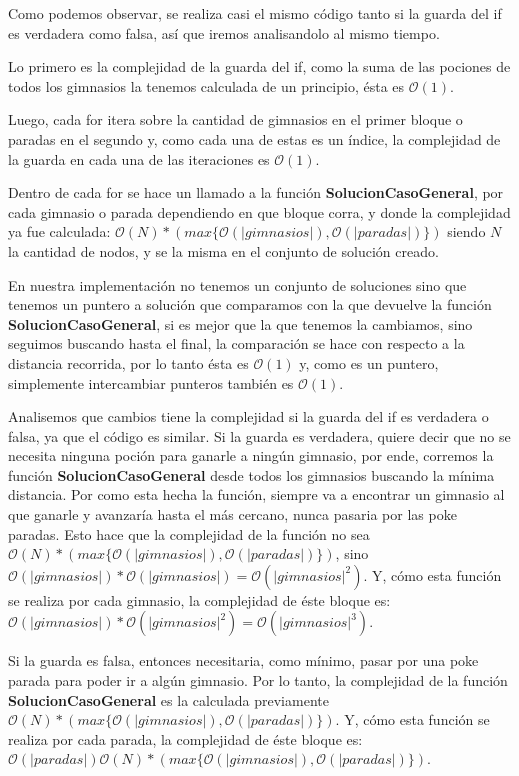 Como podemos observar, se realiza casi el mismo código tanto si la guarda del if es verdadera como falsa, así que iremos analisandolo al mismo tiempo.

Lo primero es la complejidad de la guarda del if, como la suma de las pociones de todos los gimnasios la tenemos calculada de un principio, ésta es $\mathcal{O}(1)$.

Luego, cada for itera sobre la cantidad de gimnasios en el primer bloque o paradas en el segundo y, como cada una de estas es un índice, la complejidad de la guarda en cada una de las iteraciones es $\mathcal{O}(1)$.

Dentro de cada for se hace un llamado a la función \textbf{SolucionCasoGeneral}, por cada gimnasio o parada dependiendo en que bloque corra, y donde la complejidad ya fue calculada: $\mathcal{O}(N) * (max\{\mathcal{O}(|gimnasios|), \mathcal{O}(|paradas|)\})$ siendo $N$ la cantidad de nodos, y se la misma en el conjunto de solución creado.

En nuestra implementación no tenemos un conjunto de soluciones sino que tenemos un puntero a solución que comparamos con la que devuelve la función \textbf{SolucionCasoGeneral}, si es mejor que la que tenemos la cambiamos, sino seguimos buscando hasta el final, la comparación se hace con respecto a la distancia recorrida, por lo tanto ésta es $\mathcal{O}(1)$ y, como es un puntero, simplemente intercambiar punteros también es $\mathcal{O}(1)$.

Analisemos que cambios tiene la complejidad si la guarda del if es verdadera o falsa, ya que el código es similar. Si la guarda es verdadera, quiere decir que no se necesita ninguna poción para ganarle a ningún gimnasio, por ende, corremos la función \textbf{SolucionCasoGeneral} desde todos los gimnasios buscando la mínima distancia. Por como esta hecha la función, siempre va a encontrar un gimnasio al que ganarle y avanzaría hasta el más cercano, nunca pasaria por las poke paradas. Esto hace que la complejidad de la función no sea $\mathcal{O}(N) * (max\{\mathcal{O}(|gimnasios|), \mathcal{O}(|paradas|)\})$, sino $\mathcal{O}(|gimnasios|) * \mathcal{O}(|gimnasios|) = \mathcal{O}(|gimnasios|^2)$. Y, cómo esta función se realiza por cada gimnasio, la complejidad de éste bloque es: $\mathcal{O}(|gimnasios|)* \mathcal{O}(|gimnasios|^2) = \mathcal{O}(|gimnasios|^3)$.

Si la guarda es falsa, entonces necesitaria, como mínimo, pasar por una poke parada para poder ir a algún gimnasio. Por lo tanto, la complejidad de la función \textbf{SolucionCasoGeneral} es la calculada previamente $\mathcal{O}(N) * (max\{\mathcal{O}(|gimnasios|), \mathcal{O}(|paradas|)\})$. Y, cómo esta función se realiza por cada parada, la complejidad de éste bloque es: $\mathcal{O}(|paradas|) \mathcal{O}(N) * (max\{\mathcal{O}(|gimnasios|), \mathcal{O}(|paradas|)\})$.

